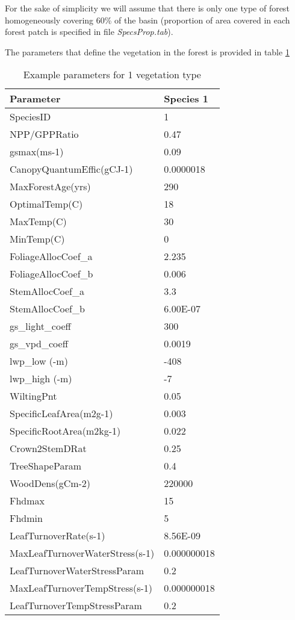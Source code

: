 For the sake of simplicity we will assume that there is only one type of forest homogeneously covering 60\% of the basin (proportion of area covered in each forest patch is specified in file \textit{SpecsProp.tab}). 

The parameters that define the vegetation in the forest is provided in table \ref{tab:exspecpars}

\begin{longtable}{|p{6.5cm}| l|}			
\caption{Example parameters for 1 vegetation type}			
\label{tab:exspecpars}\\			
\hline			
Parameter	&	Species 1	\\
\hline			
SpeciesID	&	1	\\
NPP/GPPRatio	&	0.47	\\
gsmax(ms-1)	&	0.09	\\
CanopyQuantumEffic(gCJ-1)	&	0.0000018	\\
MaxForestAge(yrs)	&	290	\\
OptimalTemp(C)	&	18	\\
MaxTemp(C)	&	30	\\
MinTemp(C)	&	0	\\
FoliageAllocCoef\_a	&	2.235	\\
FoliageAllocCoef\_b	&	0.006	\\
StemAllocCoef\_a	&	3.3	\\
StemAllocCoef\_b	&	6.00E-07	\\
gs\_light\_coeff	&	300	\\
gs\_vpd\_coeff	&	0.0019	\\
lwp\_low (-m)	&	-408	\\
lwp\_high (-m)	&	-7	\\
WiltingPnt	&	0.05	\\
SpecificLeafArea(m2g-1)	&	0.003	\\
SpecificRootArea(m2kg-1)	&	0.022	\\
Crown2StemDRat	&	0.25	\\
TreeShapeParam	&	0.4	\\
WoodDens(gCm-2)	&	220000	\\
Fhdmax	&	15	\\
Fhdmin	&	5	\\
LeafTurnoverRate(s-1)	&	8.56E-09	\\
MaxLeafTurnoverWaterStress(s-1)	&	0.000000018	\\
LeafTurnoverWaterStressParam	&	0.2	\\
MaxLeafTurnoverTempStress(s-1)	&	0.000000018	\\
LeafTurnoverTempStressParam	&	0.2	\\

\end{longtable}

